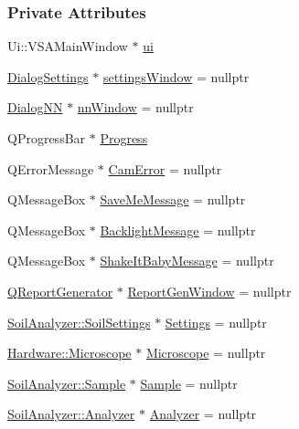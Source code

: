 \subsubsection*{Private Attributes}
\begin{DoxyCompactItemize}
\item 
Ui\+::\+V\+S\+A\+Main\+Window $\ast$ \hyperlink{class_v_s_a_main_window_a958a0581d2bf1bfe020c3b5d8f738640}{ui}
\item 
\hyperlink{class_dialog_settings}{Dialog\+Settings} $\ast$ \hyperlink{class_v_s_a_main_window_ae79d86cfa0c3adab847438b5b3dc34d6}{settings\+Window} = nullptr
\item 
\hyperlink{class_dialog_n_n}{Dialog\+N\+N} $\ast$ \hyperlink{class_v_s_a_main_window_a48dca9faab39674c88d8eb862995f11e}{nn\+Window} = nullptr
\item 
Q\+Progress\+Bar $\ast$ \hyperlink{class_v_s_a_main_window_af5c6186795a53ecfe3efffc95b6619dd}{Progress}
\item 
Q\+Error\+Message $\ast$ \hyperlink{class_v_s_a_main_window_ae59279edd83472b7096db4b119ceb45b}{Cam\+Error} = nullptr
\item 
Q\+Message\+Box $\ast$ \hyperlink{class_v_s_a_main_window_a9d76854fefeb5abf8f2fd6089987a31c}{Save\+Me\+Message} = nullptr
\item 
Q\+Message\+Box $\ast$ \hyperlink{class_v_s_a_main_window_a2202203116e6126f9361de629986b7b4}{Backlight\+Message} = nullptr
\item 
Q\+Message\+Box $\ast$ \hyperlink{class_v_s_a_main_window_a819fbdf1137bb5f88c6638b0a9213f8c}{Shake\+It\+Baby\+Message} = nullptr
\item 
\hyperlink{class_q_report_generator}{Q\+Report\+Generator} $\ast$ \hyperlink{class_v_s_a_main_window_a38a41496820a4c6ad8220c02d19ab77c}{Report\+Gen\+Window} = nullptr
\item 
\hyperlink{class_soil_analyzer_1_1_soil_settings}{Soil\+Analyzer\+::\+Soil\+Settings} $\ast$ \hyperlink{class_v_s_a_main_window_a429310b9a60f66c4283dc609f869b48d}{Settings} = nullptr
\item 
\hyperlink{class_hardware_1_1_microscope}{Hardware\+::\+Microscope} $\ast$ \hyperlink{class_v_s_a_main_window_a63378add125c78c9a83a3babe03318d7}{Microscope} = nullptr
\item 
\hyperlink{class_soil_analyzer_1_1_sample}{Soil\+Analyzer\+::\+Sample} $\ast$ \hyperlink{class_v_s_a_main_window_a09d2f0c3ef8247e9c46932f866cab132}{Sample} = nullptr
\item 
\hyperlink{class_soil_analyzer_1_1_analyzer}{Soil\+Analyzer\+::\+Analyzer} $\ast$ \hyperlink{class_v_s_a_main_window_a15db0a815b5c9abb5b8ea1bae21e17c9}{Analyzer} = nullptr

\end{DoxyCompactItemize}
